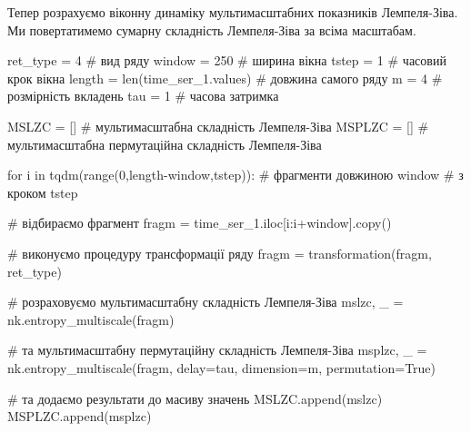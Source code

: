 \documentclass[
  letterpaper,
]{report}
\newenvironment{Shaded}{\begin{snugshade}}{\end{snugshade}}
\newcommand{\BuiltInTok}[1]{\textcolor[rgb]{0.00,0.23,0.31}{#1}}
\newcommand{\CommentTok}[1]{\textcolor[rgb]{0.37,0.37,0.37}{#1}}
\newcommand{\ControlFlowTok}[1]{\textcolor[rgb]{0.00,0.23,0.31}{#1}}
\newcommand{\DecValTok}[1]{\textcolor[rgb]{0.68,0.00,0.00}{#1}}
\newcommand{\KeywordTok}[1]{\textcolor[rgb]{0.00,0.23,0.31}{#1}}
\newcommand{\NormalTok}[1]{\textcolor[rgb]{0.00,0.23,0.31}{#1}}
\newcommand{\OperatorTok}[1]{\textcolor[rgb]{0.37,0.37,0.37}{#1}}
\newcommand{\VariableTok}[1]{\textcolor[rgb]{0.07,0.07,0.07}{#1}}
\begin{document}
Тепер розрахуємо віконну динаміку мультимасштабних показників
Лемпеля-Зіва. Ми повертатимемо сумарну складність Лемпеля-Зіва за всіма
масштабам.

\begin{Shaded}
\begin{Highlighting}[]
\NormalTok{ret\_type }\OperatorTok{=} \DecValTok{4}                      \CommentTok{\# вид ряду}
\NormalTok{window }\OperatorTok{=} \DecValTok{250}                      \CommentTok{\# ширина вікна}
\NormalTok{tstep }\OperatorTok{=} \DecValTok{1}                         \CommentTok{\# часовий крок вікна }
\NormalTok{length }\OperatorTok{=} \BuiltInTok{len}\NormalTok{(time\_ser\_1.values)   }\CommentTok{\# довжина самого ряду}
\NormalTok{m }\OperatorTok{=} \DecValTok{4}                             \CommentTok{\# розмірність вкладень }
\NormalTok{tau }\OperatorTok{=} \DecValTok{1}                           \CommentTok{\# часова затримка         }

\NormalTok{MSLZC }\OperatorTok{=}\NormalTok{ []                        }\CommentTok{\# мультимасштабна складність Лемпеля{-}Зіва}
\NormalTok{MSPLZC }\OperatorTok{=}\NormalTok{ []                       }\CommentTok{\# мультимасштабна пермутаційна складність Лемпеля{-}Зіва}
\end{Highlighting}
\end{Shaded}

\begin{Shaded}
\begin{Highlighting}[]
\ControlFlowTok{for}\NormalTok{ i }\KeywordTok{in}\NormalTok{ tqdm(}\BuiltInTok{range}\NormalTok{(}\DecValTok{0}\NormalTok{,length}\OperatorTok{{-}}\NormalTok{window,tstep)):    }\CommentTok{\# фрагменти довжиною window  }
                                                \CommentTok{\# з кроком tstep}

    \CommentTok{\# відбираємо фрагмент}
\NormalTok{    fragm }\OperatorTok{=}\NormalTok{ time\_ser\_1.iloc[i:i}\OperatorTok{+}\NormalTok{window].copy()   }

    \CommentTok{\# виконуємо процедуру трансформації ряду }
\NormalTok{    fragm }\OperatorTok{=}\NormalTok{ transformation(fragm, ret\_type)}

    \CommentTok{\# розраховуємо мультимасштабну складність Лемпеля{-}Зіва }
\NormalTok{    mslzc, \_ }\OperatorTok{=}\NormalTok{ nk.entropy\_multiscale(fragm)}

    \CommentTok{\# та мультимасштабну пермутаційну складність Лемпеля{-}Зіва}
\NormalTok{    msplzc, \_ }\OperatorTok{=}\NormalTok{ nk.entropy\_multiscale(fragm, }
\NormalTok{                                      delay}\OperatorTok{=}\NormalTok{tau, }
\NormalTok{                                      dimension}\OperatorTok{=}\NormalTok{m, }
\NormalTok{                                      permutation}\OperatorTok{=}\VariableTok{True}\NormalTok{)}


    \CommentTok{\# та додаємо результати до масиву значень}
\NormalTok{    MSLZC.append(mslzc)}
\NormalTok{    MSPLZC.append(msplzc)}
\end{Highlighting}
\end{Shaded}
\end{document}
